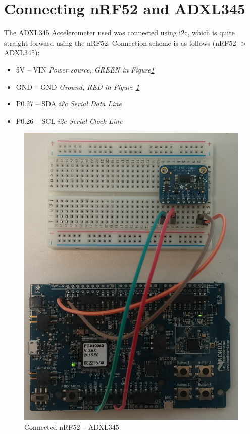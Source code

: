 \section{Connecting nRF52 and ADXL345}

The ADXL345 Accelerometer used was connected using \gls{i2c}, which is quite straight forward using the nRF52. Connection scheme is as follows (nRF52 -> ADXL345): 

\begin{itemize}
  \item 5V -- VIN		\tab  	\textit{Power source, GREEN in Figure\ref{fig:nrf-adxl345}}
  \item GND -- GND 		\tab 	\textit{Ground, RED in Figure \ref{fig:nrf-adxl345}}
  \item P0.27 -- SDA	\tab	\textit{\gls{i2c} Serial Data Line}
  \item P0.26 -- SCL	\tab 	\textit{\gls{i2c} Serial Clock Line}
\end{itemize} 

\begin{figure}[h]
    \centering
    \includegraphics[scale=0.35]{nrf-adxl.png}    \caption{Connected nRF52 -- ADXL345}
    \label{fig:nrf-adxl345}
\end{figure}

